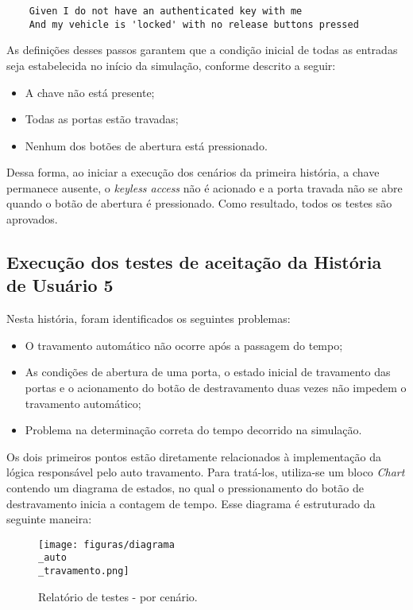 \begin{verbatim}
	Given I do not have an authenticated key with me
	And my vehicle is 'locked' with no release buttons pressed
\end{verbatim}

As definições desses passos garantem que a condição inicial de todas as entradas seja estabelecida no início da simulação, conforme descrito a seguir:

\begin{itemize}
	\item A chave não está presente;
	\item Todas as portas estão travadas;
	\item Nenhum dos botões de abertura está pressionado.
\end{itemize}

Dessa forma, ao iniciar a execução dos cenários da primeira história, a chave permanece ausente, o \textit{keyless access} não é acionado e a porta travada não se 
abre quando o botão de abertura é pressionado. Como resultado, todos os testes são aprovados.


\subsection{Execução dos testes de aceitação da História de Usuário 5}

Nesta história, foram identificados os seguintes problemas:

\begin{itemize}
	\item O travamento automático não ocorre após a passagem do tempo;
	\item As condições de abertura de uma porta, o estado inicial de travamento das portas e o acionamento do botão de destravamento duas vezes não impedem o travamento automático;
	\item Problema na determinação correta do tempo decorrido na simulação.
\end{itemize}

Os dois primeiros pontos estão diretamente relacionados à implementação da lógica responsável pelo auto travamento. Para tratá-los, utiliza-se um bloco \textit{Chart} 
contendo um diagrama de estados, no qual o pressionamento do botão de destravamento inicia a contagem de tempo. Esse diagrama é estruturado da seguinte maneira:

\begin{figure}[H]
\centering
\texttt{[image: figuras/diagrama\\\_auto\\\_travamento.png]}
\caption{Relatório de testes - por cenário.}
\end{figure}

